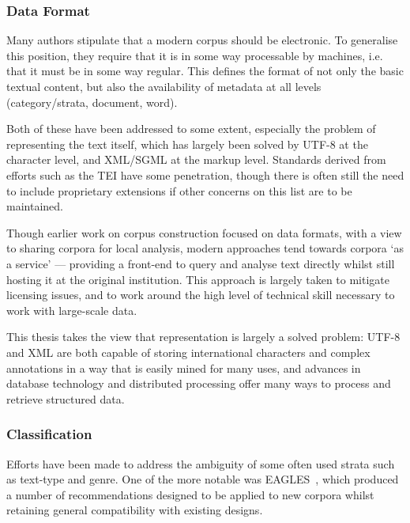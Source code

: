 



\subsubsection{Data Format}
Many authors stipulate that a modern corpus should be electronic.  To generalise this position, they require that it is in some way processable by machines, i.e. that it must be in some way regular.
This defines the format of not only the basic textual content, but also the availability of metadata at all levels (category/strata, document, word).

Both of these have been addressed to some extent, especially the problem of representing the text itself, which has largely been solved by UTF-8 at the character level, and XML/SGML at the markup level.  Standards derived from efforts such as the TEI\cite{ide1995tei} have some penetration, though there is often still the need to include proprietary extensions if other concerns on this list are to be maintained.

Though earlier work on corpus construction focused on data formats\cite{atkins1992corpus,EagTcwgCtypeaglespreliminary}, with a view to sharing corpora for local analysis, modern approaches tend towards corpora `as a service'\cite{hardie2012cqpweb,ferraresi2008introducing} --- providing a front-end to query and analyse text directly whilst still hosting it at the original institution.  This approach is largely taken to mitigate licensing issues, and to work around the high level of technical skill necessary to work with large-scale data.

This thesis takes the view that representation is largely a solved problem: UTF-8 and XML are both capable of storing international characters and complex annotations in a way that is easily mined for many uses, and advances in database technology and distributed processing offer many ways to process and retrieve structured data.




\subsubsection{Classification}
Efforts have been made to address the ambiguity of some often used strata such as text-type and genre.  One of the more notable was EAGLES~\cite{EagTcwgCtypeaglespreliminary}, which produced a number of recommendations designed to be applied to new corpora whilst retaining general compatibility with existing designs.


